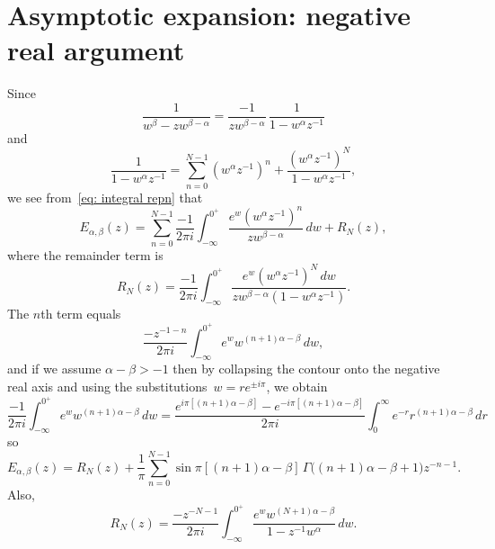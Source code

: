 \documentclass[12pt,a4paper]{article}
\begin{document}
\section{Asymptotic expansion: negative real argument}
Since
\[
\frac{1}{w^\beta-zw^{\beta-\alpha}}=\frac{-1}{zw^{\beta-\alpha}}
    \,\frac{1}{1-w^\alpha z^{-1}}
\]
and
\[
\frac{1}{1-w^\alpha z^{-1}}=\sum_{n=0}^{N-1}(w^\alpha z^{-1})^n
    +\frac{(w^\alpha z^{-1})^N}{1-w^\alpha z^{-1}},
\]
we see from~\eqref{eq: integral repn} that
\[
E_{\alpha,\beta}(z)=\sum_{n=0}^{N-1}\frac{-1}{2\pi i}\int_{-\infty}^{0^+}
    \frac{e^w(w^\alpha z^{-1})^n}{zw^{\beta-\alpha}}\,dw+R_N(z),
\]
where the remainder term is
\[
R_N(z)=\frac{-1}{2\pi i}\int_{-\infty}^{0^+}
    \frac{e^w(w^\alpha z^{-1})^N\,dw}{zw^{\beta-\alpha}(1-w^\alpha z^{-1})}.
\]
The $n$th term equals
\[
\frac{-z^{-1-n}}{2\pi i}\int_{-\infty}^{0^+}e^w w^{(n+1)\alpha-\beta}\,dw,
\]
and if we assume $\alpha-\beta>-1$ then by collapsing the contour onto the 
negative real axis and using the substitutions~$w=re^{\pm i\pi}$, we obtain
\[
\frac{-1}{2\pi i}\int_{-\infty}^{0^+}e^w w^{(n+1)\alpha-\beta}\,dw
    =\frac{e^{i\pi[(n+1)\alpha-\beta]}-e^{-i\pi[(n+1)\alpha-\beta]}}{2\pi i}
    \int_0^\infty e^{-r}r^{(n+1)\alpha-\beta}\,dr
\]
so
\[
E_{\alpha,\beta}(z)=R_N(z)+\frac{1}{\pi}\sum_{n=0}^{N-1}
    \sin\pi[(n+1)\alpha-\beta]\,\Gamma\bigl((n+1)\alpha-\beta+1\bigr)z^{-n-1}.
\]
Also,
\begin{equation}\label{eq: RN(z)}
R_N(z)=\frac{-z^{-N-1}}{2\pi i}\int_{-\infty}^{0^+}
    \frac{e^w w^{(N+1)\alpha-\beta}}{1-z^{-1}w^\alpha}\,dw.
\end{equation}
\end{document}
